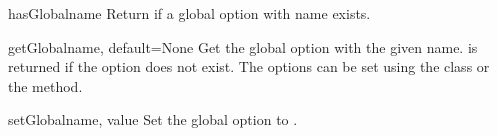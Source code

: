 \begin{methoddesc}{hasGlobal}{name}
Return  if a global option with name  exists.
\end{methoddesc}

\begin{methoddesc}{getGlobal}{name, default=None}
Get the global option with the given name.  is returned
if the option does not exist. The options can be set using the 
 class or the  method.
\end{methoddesc}

\begin{methoddesc}{setGlobal}{name, value}
Set the global option  to .
\end{methoddesc}
